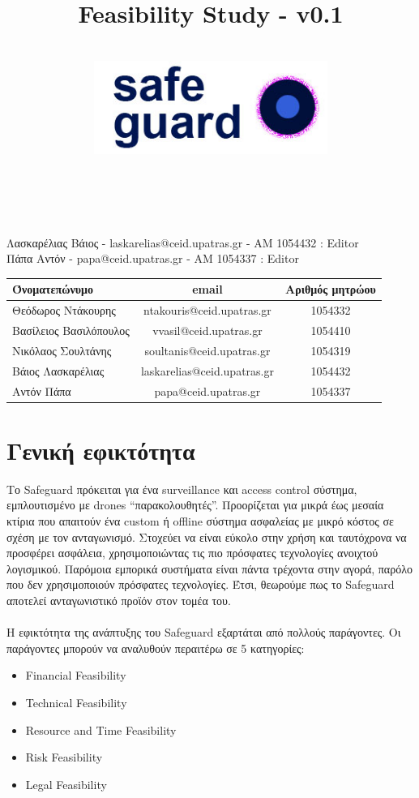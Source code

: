 \documentclass{article}
\title{Feasibility Study - v0.1}
\author{\\
\includegraphics[width=3in]{safeguard}\\[1ex]\\\\
}
\begin{document}
\maketitle
\newpage

\begin{center}
Λασκαρέλιας Βάιος - laskarelias@ceid.upatras.gr - ΑΜ 1054432 : Editor \\
Πάπα Αντόν - papa@ceid.upatras.gr - ΑΜ 1054337 : Editor
\end{center}

\begin{tabular}{|l|c|c|}
\hline
Όνοματεπώνυμο & email & Αριθμός μητρώου  \\
\hline
Θεόδωρος Ντάκουρης & ntakouris@ceid.upatras.gr & 1054332 \\
Βασίλειος Βασιλόπουλος & vvasil@ceid.upatras.gr &  1054410\\
Νικόλαος Σουλτάνης & soultanis@ceid.upatras.gr & 1054319  \\
Βάιος Λασκαρέλιας & laskarelias@ceid.upatras.gr & 1054432 \\
Αντόν Πάπα & papa@ceid.upatras.gr & 1054337 \\
\hline
\end{tabular}
\renewcommand{\contentsname}{Περιεχόμενα}

\tableofcontents

\newpage
\thispagestyle{plain} %
\mbox{}
\newpage

\section{Γενική εφικτότητα}
Το Safeguard πρόκειται για ένα surveillance και access control σύστημα, εμπλουτισμένο με drones “παρακολουθητές”. Προορίζεται για μικρά έως μεσαία κτίρια που απαιτούν ένα custom ή offline σύστημα ασφαλείας με μικρό κόστος σε σχέση με τον ανταγωνισμό. Στοχεύει να είναι εύκολο στην χρήση και ταυτόχρονα να προσφέρει ασφάλεια, χρησιμοποιώντας τις πιο πρόσφατες τεχνολογίες ανοιχτού λογισμικού. Παρόμοια εμπορικά συστήματα είναι πάντα τρέχοντα στην αγορά, παρόλο που δεν χρησιμοποιούν πρόσφατες τεχνολογίες. Έτσι, θεωρούμε πως το Safeguard αποτελεί ανταγωνιστικό προϊόν στον τομέα του.\\ \\
Η εφικτότητα της ανάπτυξης του Safeguard εξαρτάται από πολλούς παράγοντες. Οι παράγοντες μπορούν να αναλυθούν περαιτέρω σε 5 κατηγορίες: \begin{itemize}
\item Financial Feasibility
\item Technical Feasibility
\item Resource and Time Feasibility
\item Risk Feasibility
\item Legal Feasibility
\end{itemize}
\end{document}
